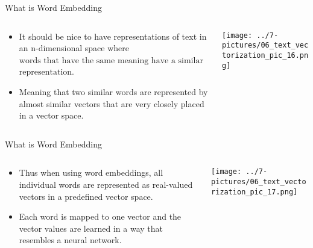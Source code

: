 \documentclass[11pt]{beamer}
\newcommand{\highlight}[1]{%
  \colorbox{yellow!100}{$\displaystyle#1$}}
\begin{document}
\begin{frame}{What is Word Embedding}
\begin{columns}[T] %
\begin{column}{.48\textwidth}
        \begin{itemize}
		\item It should be nice to have representations of text in an n-dimensional space where \highlight{\text{words that have the same}} 
\highlight{\text{meaning have a similar}} 
\highlight{\text{representation}}. 
		\item Meaning that two similar words are represented by almost similar vectors that are very closely placed in a vector space. 
        \end{itemize}
\end{column}%
\hfill%
\begin{column}{.48\textwidth}
        \texttt{[image: ../7-pictures/06\_text\_vectorization\_pic\_16.png]}
\end{column}%
\end{columns}
\end{frame}
\begin{frame}{What is Word Embedding}
\begin{columns}[T] %
\begin{column}{.48\textwidth}
        \begin{itemize}
		\item Thus when using word embeddings, all individual words are represented as real-valued vectors in a predefined vector space. 
		\item Each word is mapped to one vector and the vector values are learned in a way that resembles a neural network.
        \end{itemize}
\end{column}%
\hfill%
\begin{column}{.48\textwidth}
        \texttt{[image: ../7-pictures/06\_text\_vectorization\_pic\_17.png]}
\end{column}%
\end{columns}
\end{frame}
\end{document}
